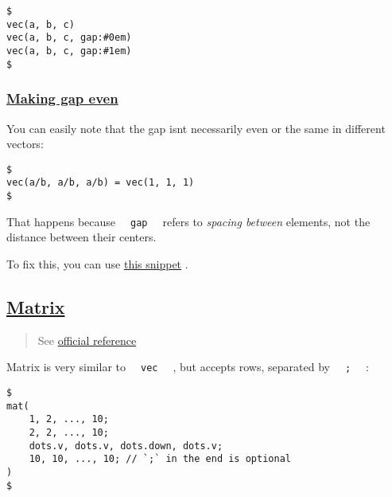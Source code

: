 \begin{verbatim}
$
vec(a, b, c)
vec(a, b, c, gap:#0em)
vec(a, b, c, gap:#1em)
$
\end{verbatim}

\pandocbounded{}

\subsubsection{\texorpdfstring{\hyperref[making-gap-even]{Making gap
even}}{Making gap even}}\label{making-gap-even}

You can easily note that the gap isn\textquotesingle t necessarily even
or the same in different vectors:

\begin{verbatim}
$
vec(a/b, a/b, a/b) = vec(1, 1, 1)
$
\end{verbatim}

\pandocbounded{}

That happens because \texttt{\ }{\texttt{\ gap\ }}\texttt{\ } refers to
\emph{spacing between} elements, not the distance between their centers.

To fix this, you can use \href{../../snippets/math/vecs.html}{this
snippet} .

\subsection{\texorpdfstring{\hyperref[matrix]{Matrix}}{Matrix}}\label{matrix}

\begin{quote}
See \href{https://typst.app/docs/reference/math/mat/}{official
reference}
\end{quote}

Matrix is very similar to \texttt{\ }{\texttt{\ vec\ }}\texttt{\ } , but
accepts rows, separated by \texttt{\ }{\texttt{\ ;\ }}\texttt{\ } :

\begin{verbatim}
$
mat(
    1, 2, ..., 10;
    2, 2, ..., 10;
    dots.v, dots.v, dots.down, dots.v;
    10, 10, ..., 10; // `;` in the end is optional
)
$
\end{verbatim}

\pandocbounded{}

